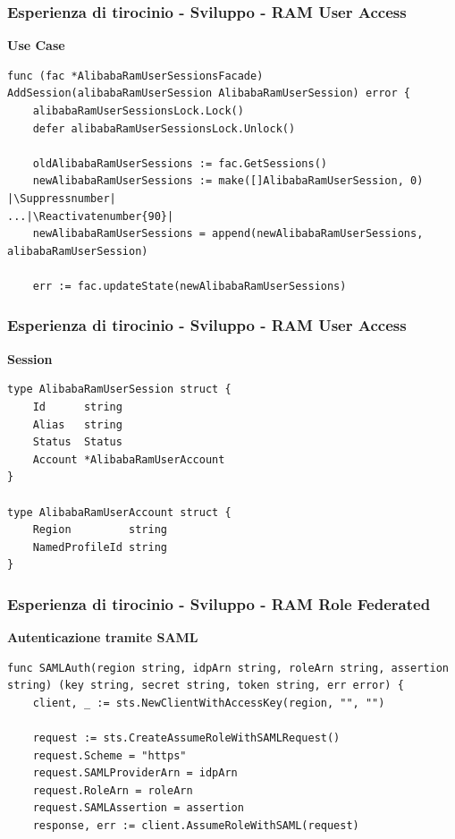 \documentclass{beamer}
\makeatletter
\let\origthelstnumber\thelstnumber
\newcommand*\Suppressnumber{%
  \lst@AddToHook{OnNewLine}{%
    \let\thelstnumber\relax%
     \advance\c@lstnumber-\@ne\relax%
    }%
}
\newcommand*\Reactivatenumber[1]{%
  \setcounter{lstnumber}{\numexpr#1-1\relax}
  \lst@AddToHook{OnNewLine}{%
   \let\thelstnumber\origthelstnumber%
   \refstepcounter{lstnumber}
  }%
}
\makeatother
\begin{document}
\begin{frame}[fragile]
 \frametitle{Esperienza di tirocinio - Sviluppo - RAM User Access}
 \centering
 \textbf{Use Case}\\
 \begin{lstlisting}[style=customgo, caption=alibaba\_ram\_user\_session\_facade.go (righe 64-92), captionpos=b, firstnumber=64]
func (fac *AlibabaRamUserSessionsFacade) AddSession(alibabaRamUserSession AlibabaRamUserSession) error {
	alibabaRamUserSessionsLock.Lock()
	defer alibabaRamUserSessionsLock.Unlock()

	oldAlibabaRamUserSessions := fac.GetSessions()
	newAlibabaRamUserSessions := make([]AlibabaRamUserSession, 0) |\Suppressnumber|
...|\Reactivatenumber{90}|
	newAlibabaRamUserSessions = append(newAlibabaRamUserSessions, alibabaRamUserSession)

	err := fac.updateState(newAlibabaRamUserSessions)
 \end{lstlisting}
\end{frame}

\begin{frame}[fragile]
 \frametitle{Esperienza di tirocinio - Sviluppo - RAM User Access}
 \centering
 \textbf{Session}\\
 \begin{lstlisting}[style=customgo, caption=alibaba\_ram\_user\_session.go (righe 9-19), captionpos=b, firstnumber=9]
type AlibabaRamUserSession struct {
	Id      string
	Alias   string
	Status  Status
	Account *AlibabaRamUserAccount
}

type AlibabaRamUserAccount struct {
	Region         string
	NamedProfileId string
}
 \end{lstlisting}
\end{frame}

\begin{frame}[fragile]
 \frametitle{Esperienza di tirocinio - Sviluppo - RAM Role Federated}
 \centering
 \textbf{Autenticazione tramite SAML}\\
 \begin{lstlisting}[style=customgo, caption=alibaba\_ram\_role\_federated\_session\_actions.go (righe 20-28), captionpos=b, firstnumber=20]
func SAMLAuth(region string, idpArn string, roleArn string, assertion string) (key string, secret string, token string, err error) {
	client, _ := sts.NewClientWithAccessKey(region, "", "")

	request := sts.CreateAssumeRoleWithSAMLRequest()
	request.Scheme = "https"
	request.SAMLProviderArn = idpArn
	request.RoleArn = roleArn
	request.SAMLAssertion = assertion
	response, err := client.AssumeRoleWithSAML(request)
 \end{lstlisting}
\end{frame}
\end{document}
